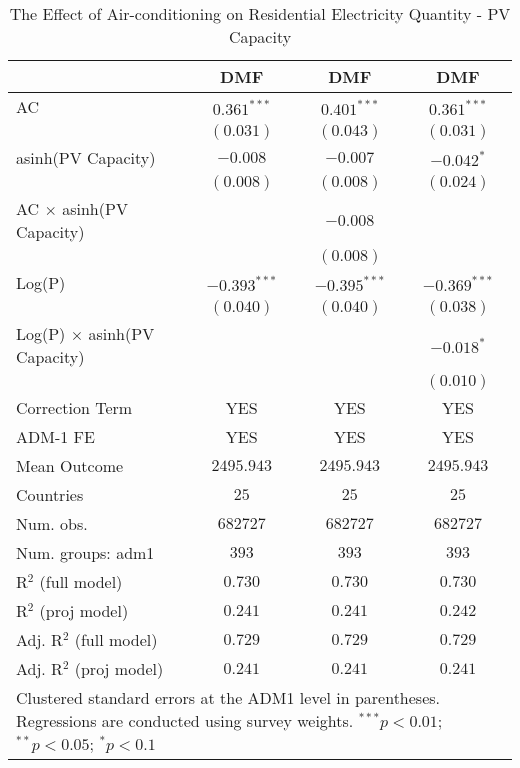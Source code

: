 
\begin{table}[htbp]
\caption{The Effect of Air-conditioning on Residential Electricity Quantity - PV Capacity}
\begin{center}
\begin{tabular}{l c c c}
\hline
 & DMF & DMF & DMF \\
\hline
AC                                 & $0.361^{***}$  & $0.401^{***}$  & $0.361^{***}$  \\
                                   & $(0.031)$      & $(0.043)$      & $(0.031)$      \\
asinh(PV Capacity)                 & $-0.008$       & $-0.007$       & $-0.042^{*}$   \\
                                   & $(0.008)$      & $(0.008)$      & $(0.024)$      \\
AC $\times$ asinh(PV Capacity)     &                & $-0.008$       &                \\
                                   &                & $(0.008)$      &                \\
Log(P)                             & $-0.393^{***}$ & $-0.395^{***}$ & $-0.369^{***}$ \\
                                   & $(0.040)$      & $(0.040)$      & $(0.038)$      \\
Log(P) $\times$ asinh(PV Capacity) &                &                & $-0.018^{*}$   \\
                                   &                &                & $(0.010)$      \\
\hline
Correction Term                    & YES            & YES            & YES            \\
ADM-1 FE                           & YES            & YES            & YES            \\
Mean Outcome                       & $2495.943$     & $2495.943$     & $2495.943$     \\
Countries                          & $25$           & $25$           & $25$           \\
Num. obs.                          & $682727$       & $682727$       & $682727$       \\
Num. groups: adm1                  & $393$          & $393$          & $393$          \\
R$^2$ (full model)                 & $0.730$        & $0.730$        & $0.730$        \\
R$^2$ (proj model)                 & $0.241$        & $0.241$        & $0.242$        \\
Adj. R$^2$ (full model)            & $0.729$        & $0.729$        & $0.729$        \\
Adj. R$^2$ (proj model)            & $0.241$        & $0.241$        & $0.241$        \\
\hline
\multicolumn{4}{l}{\scriptsize{Clustered standard errors at the ADM1 level in parentheses. Regressions are conducted using survey weights. $^{***}p<0.01$; $^{**}p<0.05$; $^{*}p<0.1$}}
\end{tabular}
\label{main: tableA12}
\end{center}
\end{table}
